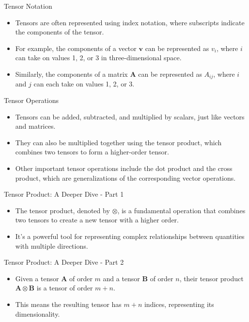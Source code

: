 \documentclass{beamer}
\begin{document}
\begin{frame}{Tensor Notation}
    \begin{itemize}
        \item Tensors are often represented using index notation, where subscripts indicate the components of the tensor.
        \item For example, the components of a vector $\mathbf{v}$ can be represented as $v_i$, where $i$ can take on values 1, 2, or 3 in three-dimensional space.
        \item Similarly, the components of a matrix $\mathbf{A}$ can be represented as $A_{ij}$, where $i$ and $j$ can each take on values 1, 2, or 3.
    \end{itemize}
\end{frame}

\begin{frame}{Tensor Operations}
    \begin{itemize}
        \item Tensors can be added, subtracted, and multiplied by scalars, just like vectors and matrices.
        \item They can also be multiplied together using the tensor product, which combines two tensors to form a higher-order tensor.
        \item Other important tensor operations include the dot product and the cross product, which are generalizations of the corresponding vector operations.
    \end{itemize}
\end{frame}

\begin{frame}{Tensor Product: A Deeper Dive - Part 1}
    \begin{itemize}
        \item The tensor product, denoted by $\otimes$, is a fundamental operation that combines two tensors to create a new tensor with a higher order.
        \item It's a powerful tool for representing complex relationships between quantities with multiple directions.
    \end{itemize}
\end{frame}

\begin{frame}{Tensor Product: A Deeper Dive - Part 2}
    \begin{itemize}
        \item Given a tensor $\mathbf{A}$ of order $m$ and a tensor $\mathbf{B}$ of order $n$, their tensor product $\mathbf{A} \otimes \mathbf{B}$ is a tensor of order $m + n$.
        \item This means the resulting tensor has $m + n$ indices, representing its dimensionality.
    \end{itemize}
\end{frame}
\end{document}
